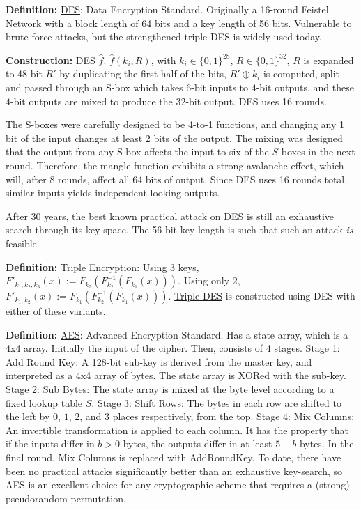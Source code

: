 \documentclass[10pt]{article}
\newcommand{\defn}[1]{{\bf Definition:} \underline{#1}}
\newcommand{\con}[1]{{\bf Construction:} \underline{#1}}
\newcommand{\xor}{\oplus}
\begin{document}
\begin{multicols}{4}
\defn{DES}: Data Encryption Standard. Originally a 16-round Feistel Network with a block length of 64 bits and a key length of 56 bits. Vulnerable to brute-force attacks, but the strengthened triple-DES is widely used today.

\con{DES $\hat{f}$}. $\hat{f}(k_i,R)$, with $k_i\in\{0,1\}^{28}$, $R\in\{0,1\}^{32}$, $R$ is expanded to 48-bit $R'$ by duplicating the first half of the bits, $R'\xor k_i$ is computed, split and passed through an S-box which takes $6$-bit inputs to $4$-bit outputs, and these $4$-bit outputs are mixed to produce the $32$-bit output. DES uses 16 rounds.

The S-boxes were carefully designed to be 4-to-1 functions, and changing any 1 bit of the input changes at least 2 bits of the output. The mixing was designed that the output from any S-box affects the input to six of the $S$-boxes in the next round. Therefore, the mangle function exhibits a strong avalanche effect, which will, after 8 rounds, affect all 64 bits of output. Since DES uses 16 rounds total, similar inputs yields independent-looking outputs.

After 30 years, the best known practical attack on DES is still an exhaustive search through its key space. The 56-bit key length is such that such an attack {\it is} feasible.

\defn{Triple Encryption}: Using 3 keys, $F'_{k_1,k_2,k_3}(x):=F_{k_3}(F_{k_2}^{-1}(F_{k_1}(x)))$. Using only 2, $F'_{k_1,k_2}(x):=F_{k_1}(F_{k_2}^{-1}(F_{k_1}(x)))$. \underline{Triple-DES} is constructed using DES with either of these variants.

\defn{AES}: Advanced Encryption Standard. Has a state array, which is a 4x4 array. Initially the input of the cipher. Then, consists of 4 stages. Stage 1: Add Round Key: A 128-bit sub-key is derived from the master key, and interpreted as a 4x4 array of bytes. The state array is XORed with the sub-key. Stage 2: Sub Bytes: The state array is mixed at the byte level according to a fixed lookup table $S$. Stage 3: Shift Rows: The bytes in each row are shifted to the left by $0$, $1$, $2$, and $3$ places respectively, from the top. Stage 4: Mix Columns: An invertible transformation is applied to each column. It has the property that if the inputs differ in $b>0$ bytes, the outputs differ in at least $5-b$ bytes. In the final round, Mix Columns is replaced with AddRoundKey. To date, there have been no practical attacks significantly better than an exhaustive key-search, so AES is an excellent choice for any cryptographic scheme that requires a (strong) pseudorandom permutation.


\end{multicols}
\end{document}
